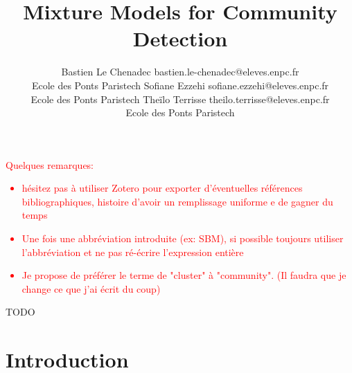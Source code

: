 \documentclass[11pt]{article}
\begin{document}
\title{Mixture Models for Community Detection}

\author{\name Bastien Le Chenadec \email bastien.le-chenadec@eleves.enpc.fr \\
    \addr Ecole des Ponts Paristech
    \AND
    \name Sofiane Ezzehi \email sofiane.ezzehi@eleves.enpc.fr \\
    \addr Ecole des Ponts Paristech
    \AND
    \name Theïlo Terrisse \email theilo.terrisse@eleves.enpc.fr \\
    \addr Ecole des Ponts Paristech
}

\maketitle

\textcolor{red}{Quelques remarques:
    \begin{itemize}
        \item hésitez pas à utiliser Zotero pour exporter d'éventuelles références bibliographiques, histoire d'avoir un remplissage uniforme e de gagner du temps
        \item Une fois une abbréviation introduite (ex: SBM), si possible toujours utiliser l'abbréviation et ne pas ré-écrire l'expression entière
        \item Je propose de préférer le terme de "cluster" à "community". (Il faudra que je change ce que j'ai écrit du coup)
    \end{itemize}
}

\begin{contribstatement}
    TODO
\end{contribstatement}


\section{Introduction}
\end{document}
